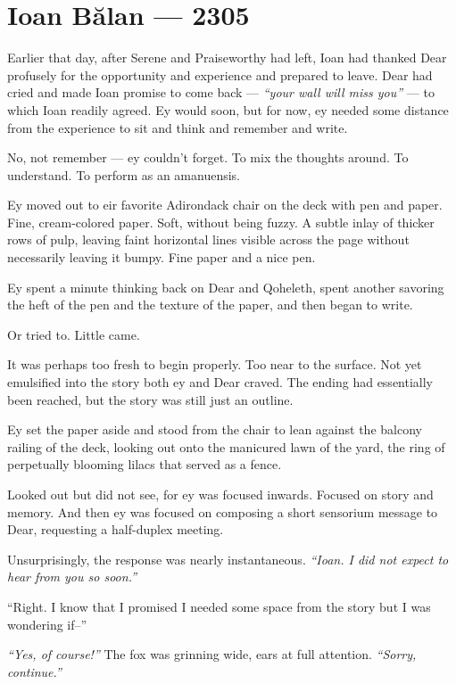 \hypertarget{ioan-bux103lan-2305}{%
\chapter*{Ioan Bălan — 2305}\label{ioan-bux103lan-2305}}

Earlier that day, after Serene and Praiseworthy had left, Ioan had thanked Dear profusely for the opportunity and experience and prepared to leave. Dear had cried and made Ioan promise to come back — \emph{``your wall will miss you''} — to which Ioan readily agreed. Ey would soon, but for now, ey needed some distance from the experience to sit and think and remember and write.

No, not remember — ey couldn't forget. To mix the thoughts around. To understand. To perform as an amanuensis.

Ey moved out to eir favorite Adirondack chair on the deck with pen and paper. Fine, cream-colored paper. Soft, without being fuzzy. A subtle inlay of thicker rows of pulp, leaving faint horizontal lines visible across the page without necessarily leaving it bumpy. Fine paper and a nice pen.

Ey spent a minute thinking back on Dear and Qoheleth, spent another savoring the heft of the pen and the texture of the paper, and then began to write.

Or tried to. Little came.

It was perhaps too fresh to begin properly. Too near to the surface. Not yet emulsified into the story both ey and Dear craved. The ending had essentially been reached, but the story was still just an outline.

Ey set the paper aside and stood from the chair to lean against the balcony railing of the deck, looking out onto the manicured lawn of the yard, the ring of perpetually blooming lilacs that served as a fence.

Looked out but did not see, for ey was focused inwards. Focused on story and memory. And then ey was focused on composing a short sensorium message to Dear, requesting a half-duplex meeting.

Unsurprisingly, the response was nearly instantaneous. \emph{``Ioan. I did not expect to hear from you so soon.''}

``Right. I know that I promised I needed some space from the story but I was wondering if--''

\emph{``Yes, of course!''} The fox was grinning wide, ears at full attention. \emph{``Sorry, continue.''}


